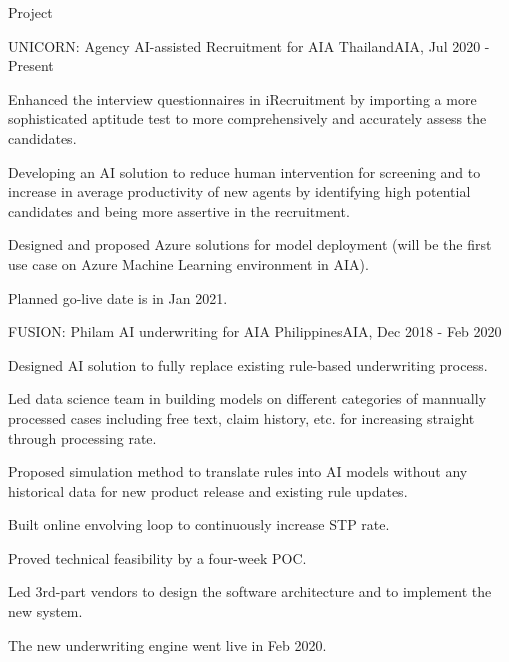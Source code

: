 \documentclass{resume} %
\begin{document}
\begin{rSection}{Project}


\begin{rSubsection}{UNICORN: Agency AI-assisted Recruitment for AIA Thailand}{}{AIA, Jul 2020 - Present}{}
\item Enhanced the interview questionnaires in iRecruitment by importing a more sophisticated aptitude test to more comprehensively and accurately assess the candidates. 
\item Developing an AI solution to reduce human intervention for screening and to increase in average productivity of new agents by identifying high potential candidates and being more assertive in the recruitment.  
\item Designed and proposed Azure solutions for model deployment (will be the first use case on Azure Machine Learning environment in AIA).
\item Planned go-live date is in Jan 2021.
\end{rSubsection}


\begin{rSubsection}{FUSION: Philam AI underwriting for AIA Philippines}{}{AIA, Dec 2018 - Feb 2020}{}
\item Designed AI solution to fully replace existing rule-based underwriting process.
\item Led data science team in building models on different categories of mannually processed cases including free text, claim history, etc. for increasing straight through processing rate.
\item Proposed simulation method to translate rules into AI models without any historical data for new product release and existing rule updates.
\item Built online envolving loop to continuously increase STP rate.
\item Proved technical feasibility by a four-week POC.
\item Led 3rd-part vendors to design the software architecture and to implement the new system. 
\item The new underwriting engine went live in Feb 2020.
\end{rSubsection}



\end{rSection}
\end{document}
